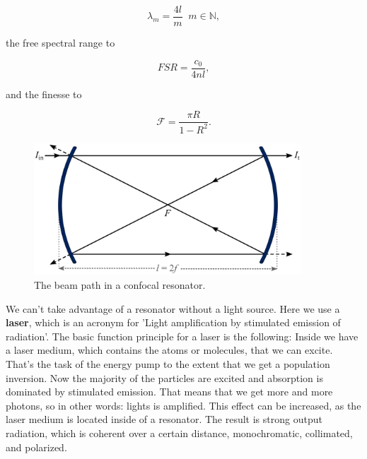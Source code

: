 \begin{equation}
\label{E:Deltaj}
\lambda_{m}=\frac{4l}{m}	\;\; m \in \mathbb{N},
\end{equation}

\noindent
the free spectral range to

\begin{equation}
\label{E:Deltaj}
FSR=\frac{c_{0}}{4nl},
\end{equation}

\noindent
and the finesse to

\begin{equation}
\label{E:Deltaj}
\mathcal{F}=\frac{\pi R}{1-R^{2}}.
\end{equation}

\begin{figure}[h]
    \centering
    \includegraphics[width=10cm]{Confres.png}
    \caption{The beam path in a confocal resonator.}
    \label{fig:Confres.}
\end{figure}

We can't take advantage of a resonator without a light source. Here we use a \textbf{laser}, which is an acronym for ’Light amplification by stimulated emission of radiation’. The basic function principle for  a laser is the following: Inside we have a laser medium, which contains the atoms or molecules, that we can excite. That's the task of the energy pump to the extent that we get a population inversion. Now the majority of the particles are excited and absorption is dominated by stimulated emission. That means that we get more and more photons, so in other words: lights is amplified. This effect can be increased, as the laser medium is located inside of a resonator. The result is strong output radiation, which is coherent over a certain distance, monochromatic, collimated, and polarized.

